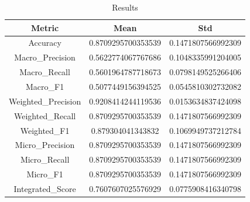 \begin{table}[htbp]
\centering
\caption{Results}
\label{tab:csv}
\small
\setlength{\tabcolsep}{4pt}
\begin{tabular}{|c|c|c|}
\hline
Metric & Mean & Std \\
\hline
Accuracy & 0.8709295700353539 & 0.1471807566992309 \\
Macro_Precision & 0.5622774067767686 & 0.1048335991204005 \\
Macro_Recall & 0.5601964787718673 & 0.0798149525266406 \\
Macro_F1 & 0.5077449156394525 & 0.0545810302732082 \\
Weighted_Precision & 0.9208414244119536 & 0.0153634837424098 \\
Weighted_Recall & 0.8709295700353539 & 0.1471807566992309 \\
Weighted_F1 & 0.879304041343832 & 0.1069949737212784 \\
Micro_Precision & 0.8709295700353539 & 0.1471807566992309 \\
Micro_Recall & 0.8709295700353539 & 0.1471807566992309 \\
Micro_F1 & 0.8709295700353539 & 0.1471807566992309 \\
Integrated_Score & 0.7607607025576929 & 0.0775908416340798 \\
\hline
\end{tabular}
\end{table}